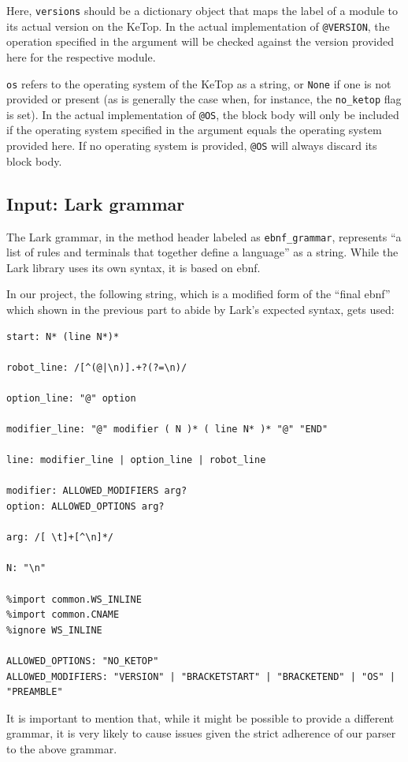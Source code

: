 Here, \verb|versions| should be a dictionary object that maps the label of a module to its actual version on the KeTop. In the actual implementation of \verb|@VERSION|, the operation specified in the argument will be checked against the version provided here for the respective module. 

\verb|os| refers to the operating system of the KeTop as a string, or \verb|None| if one is not provided or present (as is generally the case when, for instance, the \verb|no_ketop| flag is set). In the actual implementation of \verb|@OS|, the block body will only be included if the operating system specified in the argument equals the operating system provided here. If no operating system is provided, \verb|@OS| will always discard its block body.

\subsection{Input: Lark grammar}

The Lark grammar, in the method header labeled as \verb|ebnf_grammar|, represents ``a list of rules and terminals that together define a language'' as a string. While the Lark library uses its own syntax, it is based on \gls{ebnf}.\cite{py-module-lark-grammar}

In our project, the following string, which is a modified form of the ``final \gls{ebnf}'' which shown in the previous part to abide by Lark's expected syntax, gets used:

\begin{lstlisting}
start: N* (line N*)*

robot_line: /[^(@|\n)].+?(?=\n)/

option_line: "@" option 

modifier_line: "@" modifier ( N )* ( line N* )* "@" "END"

line: modifier_line | option_line | robot_line

modifier: ALLOWED_MODIFIERS arg?
option: ALLOWED_OPTIONS arg?

arg: /[ \t]+[^\n]*/

N: "\n"

%import common.WS_INLINE
%import common.CNAME
%ignore WS_INLINE

ALLOWED_OPTIONS: "NO_KETOP" 
ALLOWED_MODIFIERS: "VERSION" | "BRACKETSTART" | "BRACKETEND" | "OS" | "PREAMBLE"
\end{lstlisting}

It is important to mention that, while it might be possible to provide a different grammar, it is very likely to cause issues given the strict adherence of our parser to the above grammar. 

